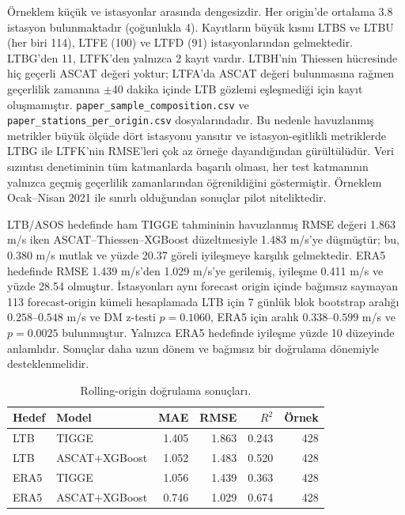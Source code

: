 \documentclass[11pt,a4paper]{article}
\begin{document}
Örneklem küçük ve istasyonlar arasında dengesizdir. Her origin'de ortalama 3.8
istasyon bulunmaktadır (çoğunlukla 4). Kayıtların büyük kısmı LTBS ve LTBU
(her biri 114), LTFE (100) ve LTFD (91) istasyonlarından gelmektedir. LTBG'den
11, LTFK'den yalnızca 2 kayıt vardır. LTBH'nin Thiessen hücresinde hiç geçerli
ASCAT değeri yoktur; LTFA'da ASCAT değeri bulunmasına rağmen geçerlilik zamanına
$\pm$40 dakika içinde LTB gözlemi eşleşmediği için kayıt oluşmamıştır.
\texttt{paper\_sample\_composition.csv} ve \texttt{paper\_stations\_per\_origin.csv}
dosyalarındadır. Bu nedenle havuzlanmış metrikler büyük ölçüde dört istasyonu
yansıtır ve istasyon-eşitlikli metriklerde LTBG ile LTFK'nin RMSE'leri çok az
örneğe dayandığından gürültülüdür. Veri
sızıntısı denetiminin tüm katmanlarda
başarılı olması, her test katmanının yalnızca geçmiş geçerlilik zamanlarından
öğrenildiğini göstermiştir. Örneklem Ocak--Nisan 2021 ile sınırlı olduğundan
sonuçlar pilot niteliktedir.

LTB/ASOS hedefinde ham TIGGE tahmininin havuzlanmış RMSE değeri 1.863 m/s iken
ASCAT--Thiessen--XGBoost düzeltmesiyle 1.483 m/s'ye düşmüştür; bu, 0.380 m/s
mutlak ve yüzde 20.37 göreli iyileşmeye karşılık gelmektedir. ERA5 hedefinde
RMSE 1.439 m/s'den 1.029 m/s'ye gerilemiş, iyileşme 0.411 m/s ve yüzde
28.54 olmuştur. İstasyonları aynı forecast origin içinde bağımsız saymayan
113 forecast-origin kümeli hesaplamada LTB için 7 günlük blok bootstrap aralığı
$0.258$--$0.548$ m/s ve DM z-testi $p=0.1060$, ERA5 için aralık
$0.338$--$0.599$ m/s ve $p=0.0025$ bulunmuştur. Yalnızca ERA5 hedefinde
iyileşme yüzde 10 düzeyinde anlamlıdır. Sonuçlar daha uzun dönem ve bağımsız bir
doğrulama dönemiyle desteklenmelidir.

\begin{table}[H]\centering
\caption{Rolling-origin doğrulama sonuçları.}\label{tab:metrics}
\begin{tabular}{llrrrr}
\toprule
Hedef & Model & MAE & RMSE & $R^2$ & Örnek\\
\midrule
LTB & TIGGE & 1.405 & 1.863 & 0.243 & 428\\
LTB & ASCAT+XGBoost & 1.052 & 1.483 & 0.520 & 428\\
ERA5 & TIGGE & 1.056 & 1.439 & 0.363 & 428\\
ERA5 & ASCAT+XGBoost & 0.746 & 1.029 & 0.674 & 428\\
\bottomrule
\end{tabular}
\end{table}
\end{document}
